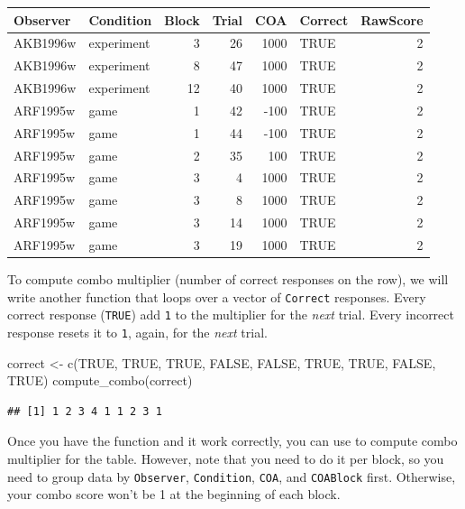 \documentclass[
]{book}
\newenvironment{Shaded}{\begin{snugshade}}{\end{snugshade}}
\newcommand{\ConstantTok}[1]{\textcolor[rgb]{0.00,0.00,0.00}{#1}}
\newcommand{\FunctionTok}[1]{\textcolor[rgb]{0.00,0.00,0.00}{#1}}
\newcommand{\NormalTok}[1]{#1}
\newcommand{\OtherTok}[1]{\textcolor[rgb]{0.56,0.35,0.01}{#1}}
\begin{document}
\begin{tabular}{l|l|r|r|r|l|r}
\hline
Observer & Condition & Block & Trial & COA & Correct & RawScore\\
\hline
AKB1996w & experiment & 3 & 26 & 1000 & TRUE & 2\\
\hline
AKB1996w & experiment & 8 & 47 & 1000 & TRUE & 2\\
\hline
AKB1996w & experiment & 12 & 40 & 1000 & TRUE & 2\\
\hline
ARF1995w & game & 1 & 42 & -100 & TRUE & 2\\
\hline
ARF1995w & game & 1 & 44 & -100 & TRUE & 2\\
\hline
ARF1995w & game & 2 & 35 & 100 & TRUE & 2\\
\hline
ARF1995w & game & 3 & 4 & 1000 & TRUE & 2\\
\hline
ARF1995w & game & 3 & 8 & 1000 & TRUE & 2\\
\hline
ARF1995w & game & 3 & 14 & 1000 & TRUE & 2\\
\hline
ARF1995w & game & 3 & 19 & 1000 & TRUE & 2\\
\hline
\end{tabular}

To compute combo multiplier (number of correct responses on the row), we will write another function that loops over a vector of \texttt{Correct} responses. Every correct response (\texttt{TRUE}) add \texttt{1} to the multiplier for the \emph{next} trial. Every incorrect response resets it to \texttt{1}, again, for the \emph{next} trial.

\begin{Shaded}
\begin{Highlighting}[]
\NormalTok{correct }\OtherTok{\textless{}{-}} \FunctionTok{c}\NormalTok{(}\ConstantTok{TRUE}\NormalTok{, }\ConstantTok{TRUE}\NormalTok{, }\ConstantTok{TRUE}\NormalTok{, }\ConstantTok{FALSE}\NormalTok{, }\ConstantTok{FALSE}\NormalTok{, }\ConstantTok{TRUE}\NormalTok{, }\ConstantTok{TRUE}\NormalTok{, }\ConstantTok{FALSE}\NormalTok{, }\ConstantTok{TRUE}\NormalTok{)}
\FunctionTok{compute\_combo}\NormalTok{(correct)}
\end{Highlighting}
\end{Shaded}

\begin{verbatim}
## [1] 1 2 3 4 1 1 2 3 1
\end{verbatim}

Once you have the function and it work correctly, you can use to compute combo multiplier for the table. However, note that you need to do it per block, so you need to group data by \texttt{Observer}, \texttt{Condition}, \texttt{COA}, and \texttt{COABlock} first. Otherwise, your combo score won't be 1 at the beginning of each block.
\end{document}
